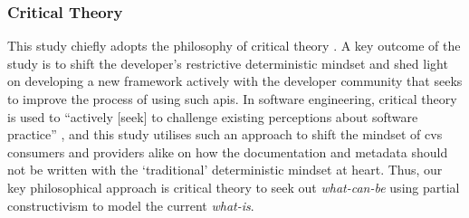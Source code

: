 \subsubsection{Critical Theory}
This study chiefly adopts the philosophy of critical theory \citep{Calhoun:1995ww}. A key outcome of the study is to shift the developer's restrictive deterministic mindset and shed light on developing a new framework actively with the developer community that seeks to improve the process of using such \glspl{api}. In software engineering, critical theory is used to ``actively [seek] to challenge existing perceptions about software practice'' \citep{Easterbrook:2007ws}, and this study utilises such an approach to shift the mindset of \gls{cvs} consumers and providers alike on how the documentation and metadata should not be written with the `traditional' deterministic mindset at heart. Thus, our key philosophical approach is critical theory to seek out \textit{what-can-be} using  partial constructivism to model the current \textit{what-is}.
